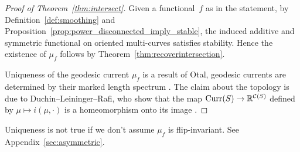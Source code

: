 \begin{proof}[Proof of Theorem~\ref{thm:intersect}]
  Given a functional~$f$ as in the statement, by Definition~\ref{def:smoothing} and Proposition~\ref{prop:power_disconnected_imply_stable}, the induced additive and symmetric functional on oriented multi-curves satisfies stability. Hence the existence of $\mu_f$ follows by Theorem~\ref{thm:recoverintersection}.


  Uniqueness of the geodesic current $\mu_f$ is a result of Otal, geodesic currents are determined by their marked length spectrum \cite[Th\'eor\`eme~2]{Otal90:SpectreMarqueNegative}. The claim about the topology is due to Duchin--Leininger--Rafi, who show that the map $\operatorname{Curr}(S) \to \mathbb{R}^{\mathcal{C}(S)}$ defined by $\mu \mapsto i(\mu, \cdot)$ is a homeomorphism onto its image \cite[Theorem~12]{DLR10:DegenerationFlatMetrics}.
\end{proof}

\begin{remark}
  Uniqueness is not true if we don't assume $\mu_f$ is flip-invariant. See Appendix~\ref{sec:asymmetric}.
\end{remark}

